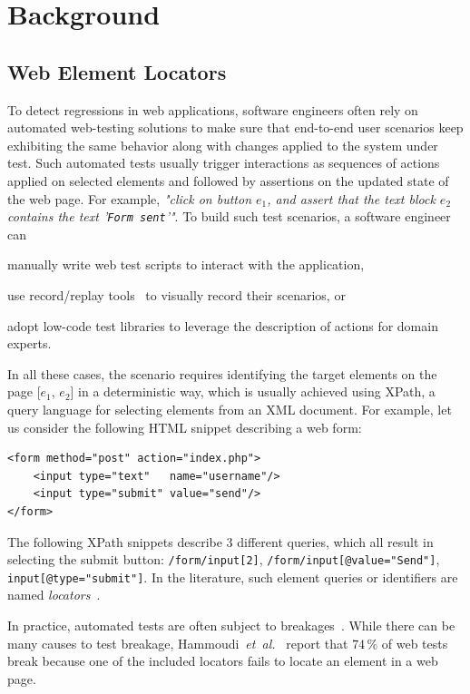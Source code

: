 \section{Background}\label{cerberus:sec:related-work}
\subsection{Web Element Locators}
To detect regressions in web applications, software engineers often rely on automated web-testing solutions to make sure that end-to-end user scenarios keep exhibiting the same behavior along with changes applied to the system under test.
Such automated tests usually trigger interactions as sequences of actions applied on selected elements and followed by assertions on the updated state of the web page.
For example, \emph{"click on button $e_1$, and assert that the text block $e_2$ contains the text '{\tt Form sent}'"}.
To build such test scenarios, a software engineer can
\begin{inparaenum}
    \item manually write web test scripts to interact with the application,
    \item use record/replay tools~\cite{burg2013interactive,sen2013jalangi,mickens2010mugshot} to visually record their scenarios, or
    \item adopt low-code test libraries to leverage the description of actions for domain experts.
\end{inparaenum}
In all these cases, the scenario requires identifying the target elements on the page [$e_1$, $e_2$] in a deterministic way, which is usually achieved using XPath, a query language for selecting elements from an XML document.
% 
For example, let us consider the following HTML snippet describing a web form:
\begin{lstlisting}
<form method="post" action="index.php"> 
    <input type="text"   name="username"/> 
    <input type="submit" value="send"/>
</form> 
\end{lstlisting}

The following XPath snippets describe 3 different queries, which all result in selecting the submit button: \lstinline!/form/input[2]!, \lstinline!/form/input[@value="Send"]!, \lstinline!input[@type="submit"]!.
In the literature, such element queries or identifiers are named \emph{locators}~\cite{leotta2014reducing}.

In practice, automated tests are often subject to breakages~\cite{hammoudi2016record}.
While there can be many causes to test breakage, Hammoudi~\emph{et~al.}~\cite{hammoudi2016record} report that $74\,\%$ of web tests break because one of the included locators fails to locate an element in a web page.

